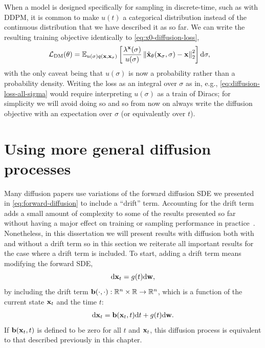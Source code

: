 When a model is designed specifically for sampling in discrete-time, such as with DDPM, it is common to make $u(t)$ a categorical distribution instead of the continuous distribution that we have described it as so far. 
We can write the resulting training objective identically to \cref{eq:x0-diffusion-loss},
\begin{align}
    \mathcal{L}_\text{DM}(\theta) &= \mathbb{E}_{u(\sigma)q({\mathbf{x}}, {\mathbf{x}}_\sigma)} \left[ \frac{\lambda^{\mathbf{x}}(\sigma)}{u(\sigma)} 
    \left\| \hat{{\mathbf{x}}}_\theta({\mathbf{x}}_\sigma, \sigma) - {\mathbf{x}} \right\|_2^2 \right] \mathrm{d}\sigma,
\end{align}
with the only caveat being that $u(\sigma)$ is now a probability rather than a probability density. Writing the loss as an integral over $\sigma$ as in, e.g., \cref{eq:diffusion-loss-all-sigma} would require interpreting $u(\sigma)$ as a train of Diracs; for simplicity we will avoid doing so and so from now on always write the diffusion objective with an expectation over $\sigma$ (or equivalently over $t$).

\section{Using more general diffusion processes} \label{sec:more-general-diffusion-processes}
Many diffusion papers use variations of the forward diffusion SDE we presented in \cref{eq:forward-diffusion} to include a ``drift'' term. Accounting for the drift term adds a small amount of complexity to some of the results presented so far without having a major effect on training or sampling performance in practice~\citep{karras2022elucidating}. Nonetheless, in this dissertation we will present results with diffusion both with and without a drift term so in this section we reiterate all important results for the case where a drift term is included. To start, adding a drift term means modifying the forward SDE,
\begin{equation}
    \mathrm{d}{\mathbf{x}}_t = g(t) \mathrm{d}{\mathbf{w}},
\end{equation}
by including the drift term ${\mathbf{b}}(\cdot, \cdot): \mathbb{R}^n \times \mathbb{R} \rightarrow \mathbb{R}^n$, which is a function of the current state ${\mathbf{x}}_t$ and the time $t$:
\begin{align} \label{eq:forward-diffusion-with-drift}
    \mathrm{d}{\mathbf{x}}_t = {\mathbf{b}}({\mathbf{x}}_t, t) \mathrm{d}t + g(t) \mathrm{d}{\mathbf{w}}.
\end{align}
If ${\mathbf{b}}({\mathbf{x}}_t, t)$ is defined to be zero for all $t$ and ${\mathbf{x}}_t$, this diffusion process is equivalent to that described previously in this chapter. 

